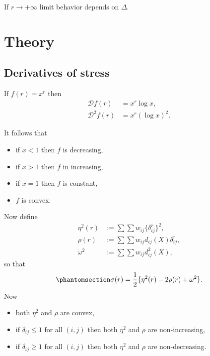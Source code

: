 \documentclass[
  12pt,
  letterpaper,
  DIV=11,
  numbers=noendperiod]{scrartcl}
\providecommand{\tightlist}{%
  \setlength{\itemsep}{0pt}\setlength{\parskip}{0pt}}\usepackage{longtable,booktabs,array}
\begin{document}
If \(r\rightarrow+\infty\) limit behavior depends on \(\Delta\).

\section{Theory}\label{theory}

\subsection{Derivatives of stress}\label{derivatives-of-stress}

If \(f(r)=x^r\) then \begin{subequations}
\begin{align}
\mathcal{D}f(r)&=x^r\log x,\label{eq-der1}\\
\mathcal{D}^2f(r)&=x^r(\log x)^2\label{eq-der2}.
\end{align}
\end{subequations}

It follows that

\begin{itemize}
\tightlist
\item
  if \(x < 1\) then \(f\) is decreasing,
\item
  if \(x > 1\) then \(f\) in increasing,
\item
  if \(x = 1\) then \(f\) is constant,
\item
  \(f\) is convex.
\end{itemize}

Now define \begin{subequations}
\begin{align}
\eta^2(r)&:=\sum\sum w_{ij}\{\delta_{ij}^r\}^2,\\
\rho(r)&:=\sum\sum w_{ij}d_{ij}(X)\delta_{ij}^r,\\
\omega^2&:=\sum\sum w_{ij}d_{ij}^2(X),
\end{align}
\end{subequations} so that
\begin{equation}\phantomsection\label{eq-sigmar}{
\sigma(r)=\frac12\{\eta^2(r)-2\rho(r)+\omega^2\}.
}\end{equation} Now

\begin{itemize}
\tightlist
\item
  both \(\eta^2\) and \(\rho\) are convex,
\item
  if \(\delta_{ij}\leq 1\) for all \((i,j)\) then both \(\eta^2\) and
  \(\rho\) are non-increasing,
\item
  if \(\delta_{ij}\geq 1\) for all \((i,j)\) then both \(\eta^2\) and
  \(\rho\) are non-decreasing.
\end{itemize}
\end{document}
